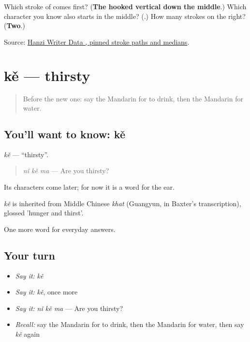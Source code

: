 \begin{tcolorbox}[breakable,colback=teal!4,colframe=teal!35!black,title={Before you move on}]
Which stroke of  comes first? (\textbf{The hooked vertical down the middle}.) Which character you know also starts in the middle? (\textbf{}.) How many strokes on the right? (\textbf{Two}.)

Source: \href{https://raw.githubusercontent.com/chanind/hanzi-writer-data/68d10a4b21150cae5e1ebbd223eed289cf32d90c/data/\%E6\%B0\%B4.json}{Hanzi Writer Data , pinned stroke paths and medians}.
\end{tcolorbox}
\section[kě]{kě — thirsty}

\label{lesson:ZH-C39-ke}



\begin{quote}
Before the new one: say the Mandarin for to drink, then the Mandarin for water.
\end{quote}

\subsection*{You'll want to know: kě}
\emph{kě} — \textquotedblleft{}thirsty\textquotedblright{}.

\begin{quote}
\emph{nǐ kě ma} — Are you thirsty?
\end{quote}

Its characters come later; for now it is a word for the ear.

\begin{cousinweb}
\emph{kě} is inherited from Middle Chinese \emph{khat} (Guangyun, in Baxter's transcription), glossed 'hunger and thirst'.
\end{cousinweb}

\begin{grammarlens}[title={What you've built}]
One more word for everyday answers.
\end{grammarlens}

\subsection*{Your turn}
\begin{itemize}
\raggedright
  \item \emph{Say it:} \emph{kě}
  \item \emph{Say it:} \emph{kě}, once more
  \item \emph{Say it:} \emph{nǐ kě ma} — Are you thirsty?
  \item \emph{Recall:} say the Mandarin for to drink, then the Mandarin for water, then say \emph{kě} again
\end{itemize}

